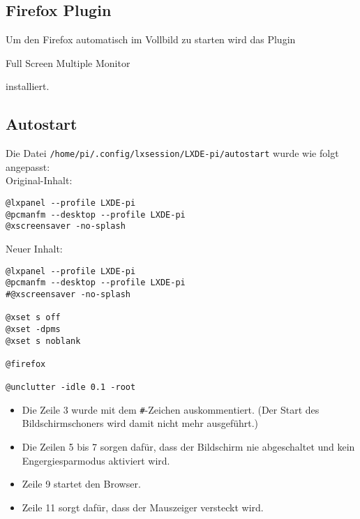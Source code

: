 \subsection{Firefox Plugin}
Um den Firefox automatisch im Vollbild zu starten wird das Plugin \begin{em}Full Screen Multiple Monitor\end{em} \cite{mkiosk} installiert.

\subsection{Autostart}
\label{sec:autostartconf}
Die Datei \lstinline|/home/pi/.config/lxsession/LXDE-pi/autostart| wurde wie folgt angepasst:\\
Original-Inhalt:
\begin{lstlisting}
@lxpanel --profile LXDE-pi
@pcmanfm --desktop --profile LXDE-pi
@xscreensaver -no-splash
\end{lstlisting}
Neuer Inhalt:
\begin{lstlisting}
@lxpanel --profile LXDE-pi
@pcmanfm --desktop --profile LXDE-pi
#@xscreensaver -no-splash

@xset s off
@xset -dpms
@xset s noblank

@firefox

@unclutter -idle 0.1 -root
\end{lstlisting}
\begin{itemize}
	\item {Die Zeile 3 wurde mit dem \lstinline|#|-Zeichen auskommentiert. (Der Start des Bildschirmschoners wird damit nicht mehr ausgeführt.)}
	\item {Die Zeilen 5 bis 7 sorgen dafür, dass der Bildschirm nie abgeschaltet und kein Engergiesparmodus aktiviert wird.}
	\item {Zeile 9 startet den Browser.}
	\item {Zeile 11 sorgt dafür, dass der Mauszeiger versteckt wird.}
\end{itemize}

